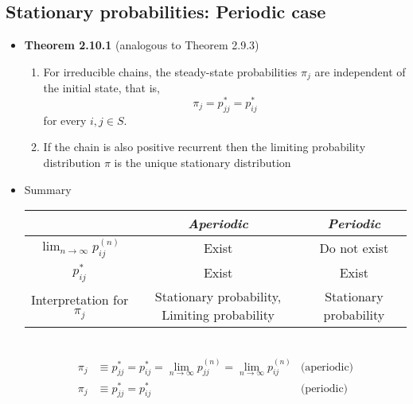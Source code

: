 \documentclass[11pt,a4paper]{article}
\begin{document}
\subsection{Stationary probabilities: Periodic case}
\begin{itemize}
	\item \textbf{Theorem 2.10.1} (analogous to Theorem 2.9.3)
		\begin{enumerate}
			\item For irreducible chains, the steady-state probabilities $\pi_j$ are independent of the initial state, that is,
				$$\pi_j = p_{jj}^* = p_{ij}^*$$
				for every $i, j \in S$.
			\item If the chain is also positive recurrent then the limiting probability distribution $\pi$ is the unique stationary distribution
		\end{enumerate}
	\item Summary \\
		\begin{tabular}{c|c|c}
			& \emph{Aperiodic} & \emph{Periodic} \\
			\hline
			$\lim_{n \to \infty}p_{ij}^{(n)}$ & Exist & Do not exist \\
			\hline
			$p_{ij}^*$ & Exist & Exist \\
			\hline
			Interpretation for $\pi_j$ & Stationary probability, Limiting probability & Stationary probability \\
		\end{tabular} \\
		\begin{align*}{}
			{\pi_j} & \equiv {p_{jj}^*} = {p_{ij}^*} = {\lim_{n \to \infty} p_{jj}^{(n)}} = {\lim_{n \to \infty} p_{ij}^{(n)}} & \text{(aperiodic)}\\
			{\pi_j} & \equiv {p_{jj}^*} = {p_{ij}^*} & \text{(periodic)}
		\end{align*}
\end{itemize}
\end{document}
